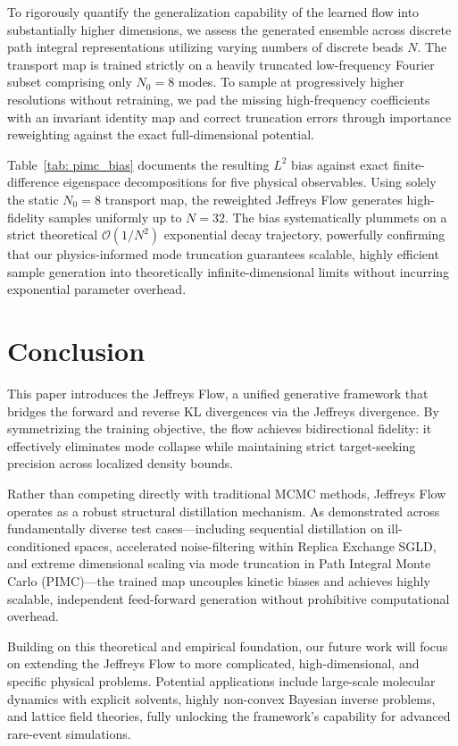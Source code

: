 \documentclass[%
 reprint,
 amsmath,amssymb,
 aps,
 pre,
]{revtex4-2}
\begin{document}
To rigorously quantify the generalization capability of the learned flow into substantially higher dimensions, we assess the generated ensemble across discrete path integral representations utilizing varying numbers of discrete beads $N$. The transport map is trained strictly on a heavily truncated low-frequency Fourier subset comprising only $N_0 = 8$ modes. To sample at progressively higher resolutions without retraining, we pad the missing high-frequency coefficients with an invariant identity map and correct truncation errors through importance reweighting against the exact full-dimensional potential.

Table~\ref{tab: pimc_bias} documents the resulting $L^2$ bias against exact finite-difference eigenspace decompositions for five physical observables. Using solely the static $N_0 = 8$ transport map, the reweighted Jeffreys Flow generates high-fidelity samples uniformly up to $N = 32$. The bias systematically plummets on a strict theoretical $\mathcal{O}(1/N^2)$ exponential decay trajectory, powerfully confirming that our physics-informed mode truncation guarantees scalable, highly efficient sample generation into theoretically infinite-dimensional limits without incurring exponential parameter overhead.

\section{Conclusion}

This paper introduces the Jeffreys Flow, a unified generative framework that bridges the forward and reverse KL divergences via the Jeffreys divergence. By symmetrizing the training objective, the flow achieves bidirectional fidelity: it effectively eliminates mode collapse while maintaining strict target-seeking precision across localized density bounds.

Rather than competing directly with traditional MCMC methods, Jeffreys Flow operates as a robust structural distillation mechanism. As demonstrated across fundamentally diverse test cases---including sequential distillation on ill-conditioned spaces, accelerated noise-filtering within Replica Exchange SGLD, and extreme dimensional scaling via mode truncation in Path Integral Monte Carlo (PIMC)---the trained map uncouples kinetic biases and achieves highly scalable, independent feed-forward generation without prohibitive computational overhead. 

Building on this theoretical and empirical foundation, our future work will focus on extending the Jeffreys Flow to more complicated, high-dimensional, and specific physical problems. Potential applications include large-scale molecular dynamics with explicit solvents, highly non-convex Bayesian inverse problems, and lattice field theories, fully unlocking the framework's capability for advanced rare-event simulations.
\end{document}
